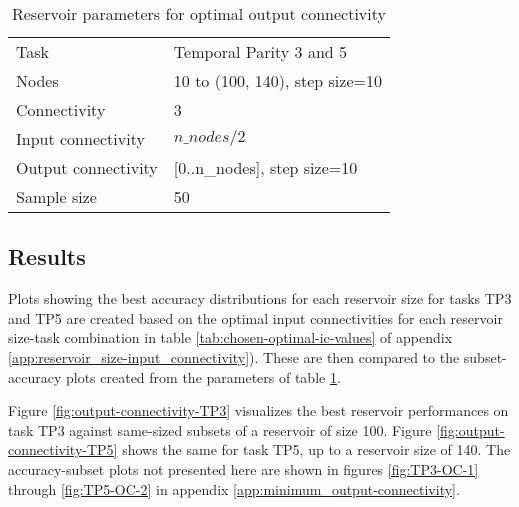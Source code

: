 \begin{table}[ht]
    \centering
    \caption{Reservoir parameters for optimal output connectivity}
    \label{tab:oc-reservoir-parameters}
    \begin{tabular}{ll}
        Task                & Temporal Parity 3 and 5        \\
        Nodes               & 10 to (100, 140), step size=10 \\
        Connectivity        & 3                              \\
        Input connectivity  & $ n\_nodes / 2 $               \\
        Output connectivity & [0..n\_nodes], step size=10    \\
        Sample size         & 50
    \end{tabular}
\end{table}

\subsection{Results}

Plots showing the best accuracy distributions for each reservoir size for tasks TP3 and TP5 are created based on the optimal input connectivities for each reservoir size-task combination in table \ref{tab:chosen-optimal-ic-values} of appendix \ref{app:reservoir_size-input_connectivity}).
These are then compared to the subset-accuracy plots created from the parameters of table \ref{tab:oc-reservoir-parameters}.

Figure \ref{fig:output-connectivity-TP3} visualizes the best reservoir performances on task TP3 against same-sized subsets of a reservoir of size 100.
Figure \ref{fig:output-connectivity-TP5} shows the same for task TP5, up to a reservoir size of 140.
The accuracy-subset plots not presented here are shown in figures \ref{fig:TP3-OC-1} through \ref{fig:TP5-OC-2} in appendix \ref{app:minimum_output-connectivity}.

\begin{figure*}[ht]
    \centering
    \caption{
        N-sized reservoir to subset comparison plots for task TP3 up to a reservoir size of 100.
        N-subset performance is practically identical to a same-sized reservoir.
        Subfigure \ref{fig:output-connectivity-TP3-composite} shows best n-sized reservoir performance,
        while subfigure \ref{fig:output-connectivity-TP3-subset} shows reservoir subset performance.
    }
    \label{fig:output-connectivity-TP3}
\end{figure*}

